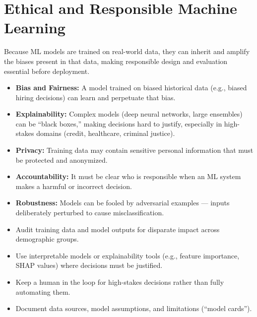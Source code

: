 \documentclass[11pt,a4paper]{article}
\begin{document}
\section{Ethical and Responsible Machine Learning}

\begin{definitionbox}
Because ML models are trained on real-world data, they can inherit and amplify the biases present in that data, making responsible design and evaluation essential before deployment.
\end{definitionbox}

\begin{alertbox}
\begin{itemize}[leftmargin=*]
  \item \textbf{Bias and Fairness:} A model trained on biased historical data (e.g., biased hiring decisions) can learn and perpetuate that bias.
  \item \textbf{Explainability:} Complex models (deep neural networks, large ensembles) can be ``black boxes,'' making decisions hard to justify, especially in high-stakes domains (credit, healthcare, criminal justice).
  \item \textbf{Privacy:} Training data may contain sensitive personal information that must be protected and anonymized.
  \item \textbf{Accountability:} It must be clear who is responsible when an ML system makes a harmful or incorrect decision.
  \item \textbf{Robustness:} Models can be fooled by adversarial examples --- inputs deliberately perturbed to cause misclassification.
\end{itemize}
\end{alertbox}

\begin{conceptbox}
\begin{itemize}[leftmargin=*]
  \item Audit training data and model outputs for disparate impact across demographic groups.
  \item Use interpretable models or explainability tools (e.g., feature importance, SHAP values) where decisions must be justified.
  \item Keep a human in the loop for high-stakes decisions rather than fully automating them.
  \item Document data sources, model assumptions, and limitations (``model cards'').
\end{itemize}
\end{conceptbox}
\end{document}
